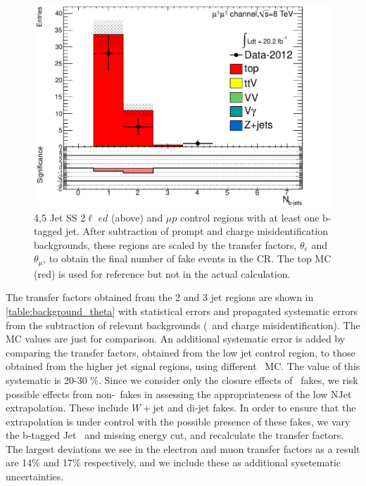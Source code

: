 \begin{figure}[htbp]
\begin{minipage}[h]{0.5\textwidth}
  \end{minipage}\hfill
  \begin{minipage}[h]{0.5\textwidth}
    \centering \includegraphics[width=\textwidth]{figs/fake/TaT-5jets-1b_nb_mm}
  \end{minipage}\hfill

  \caption{4,5 Jet SS 2$\ell$  $ed$ (above) and $\mu p$ control regions with at least one b-tagged jet. After subtraction of prompt and charge misidentification backgrounds, these regions
    are scaled by the transfer factors, $\theta_e$ and $\theta_{\mu}$, to obtain the final number of fake events in the CR. The top MC (red) is
  used for reference but not in the actual calculation.}
  \label{figure:background_45jets}
 \end{figure}

The transfer factors obtained from the 2 and 3 jet regions are shown in \ref{table:background_theta} with statistical errors and propagated systematic
errors from the subtraction of relevant backgrounds (\ttV\ and charge misidentification). The MC values are just for comparison. An additional 
systematic error is added by comparing the transfer factors, obtained from the low jet control region, to those obtained from the 
higher jet signal regions, using different \ttbar\ MC. The value of this systematic is 20-30 \%. Since we consider only the closure effects of 
\ttbar\ fakes, we risk possible effects from non-\ttbar\ fakes in assessing the appropriateness of the low NJet extrapolation. These include
$W+$jet and di-jet fakes. In order to ensure that the extrapolation is under control with the possible presence of these fakes, we vary the b-tagged
Jet \pt\ and missing energy cut, and recalculate the transfer factors. The largest deviations we see in the electron and muon transfer factors
as a result are 14\% and 17\% respectively, and we include these as additional sysetematic uncertainties. 


